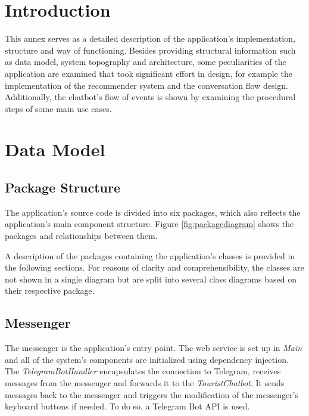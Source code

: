 
\section{Introduction}
This annex serves as a detailed description of the application’s implementation, structure and way of functioning. Besides providing structural information such as data model, system topography and architecture, some peculiarities of the application are examined that took significant effort in design, for example the implementation of the recommender system and the conversation flow design. Additionally, the chatbot’s flow of events is shown by examining the procedural steps of some main use cases.

\section{Data Model}
\subsection{Package Structure}
The application’s source code is divided into six packages, which also reflects the application’s main component structure. Figure \ref{fig:packagediagram} shows the packages and relationships between them. 


A description of the packages containing the application’s classes is provided in the following sections. For reasons of clarity and comprehensibility, the classes are not shown in a single diagram but are split into several class diagrams based on their respective package.

\subsection{Messenger}
The messenger is the application’s entry point. The web service is set up in \textit{Main} and all of the system’s components are initialized using dependency injection. The \textit{TelegramBotHandler} encapsulates the connection to Telegram, receives messages from the messenger and forwards it to the  \textit{TouristChatbot}. It sends messages back to the messenger and triggers the modification of the messenger’s keyboard buttons if needed. To do so, a Telegram Bot API \cite{telegrambotapi} is used.


